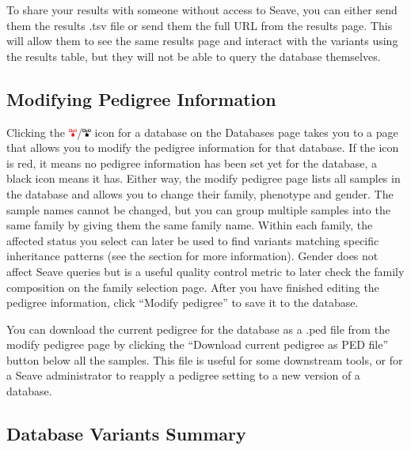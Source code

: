 \documentclass[11pt, a4paper]{article}
\begin{document}
To share your results with someone without access to Seave, you can either send them the results .tsv file or send them the full URL from the results page. This will allow them to see the same results page and interact with the variants using the results table, but they will not be able to query the database themselves.

\subsection{Modifying Pedigree Information}\label{modifyPedigree}

Clicking the \includegraphics[width=8pt]{pedigree_icon_red.png}/\includegraphics[width=8pt]{pedigree_icon.png} icon for a database on the Databases page takes you to a page that allows you to modify the pedigree information for that database. If the icon is red, it means no pedigree information has been set yet for the database, a black icon means it has. Either way, the modify pedigree page lists all samples in the database and allows you to change their family, phenotype and gender. The sample names cannot be changed, but you can group multiple samples into the same family by giving them the same family name. Within each family, the affected status you select can later be used to find variants matching specific inheritance patterns (see the  section for more information). Gender does not affect Seave queries but is a useful quality control metric to later check the family composition on the family selection page. After you have finished editing the pedigree information, click ``Modify pedigree'' to save it to the database.

You can download the current pedigree for the database as a .ped file from the modify pedigree page by clicking the ``Download current pedigree as PED file'' button below all the samples. This file is useful for some downstream tools, or for a Seave administrator to reapply a pedigree setting to a new version of a database. 

\subsection{Database Variants Summary}\label{databaseSummary}
\end{document}
